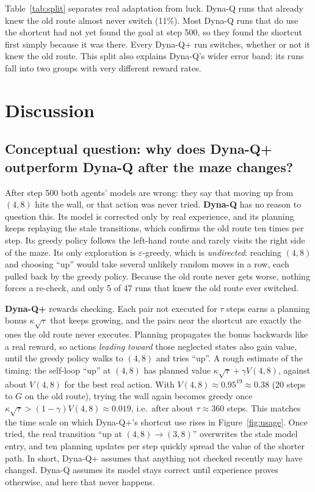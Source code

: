 \documentclass[11pt]{article}
\begin{document}
\noindent Table~\ref{tab:split} separates real adaptation from luck. Dyna-Q runs that already
knew the old route almost never switch (11\%). Most Dyna-Q runs that do use the shortcut had not
yet found the goal at step 500, so they found the shortcut first simply because it was there.
Every Dyna-Q+ run switches, whether or not it knew the old route. This split also explains
Dyna-Q's wider error band: its runs fall into two groups with very different reward rates.

\section{Discussion}

\subsection{Conceptual question: why does Dyna-Q+ outperform Dyna-Q after the maze changes?}
After step 500 both agents' models are wrong: they say that moving up from $(4,8)$ hits the
wall, or that action was never tried. \textbf{Dyna-Q} has no reason to question this. Its model
is corrected only by real experience, and its planning keeps replaying the stale transitions,
which confirms the old route ten times per step. Its greedy policy follows the left-hand route
and rarely visits the right side of the maze. Its only exploration is $\varepsilon$-greedy, which
is \emph{undirected}: reaching $(4,8)$ and choosing ``up'' would take several unlikely random
moves in a row, each pulled back by the greedy policy. Because the old route never gets worse,
nothing forces a re-check, and only 5 of 47 runs that knew the old route ever switched.

\textbf{Dyna-Q+} rewards checking. Each pair not executed for $\tau$ steps earns a planning bonus
$\kappa\sqrt{\tau}$ that keeps growing, and the pairs near the shortcut are exactly the ones the old
route never executes. Planning propagates the bonus backwards like a real reward, so actions
\emph{leading toward} those neglected states also gain value, until the greedy policy walks to
$(4,8)$ and tries ``up''. A rough estimate of the timing: the self-loop ``up'' at $(4,8)$ has
planned value $\kappa\sqrt{\tau} + \gamma V(4,8)$, against about $V(4,8)$ for the best real
action. With $V(4,8) \approx 0.95^{19} \approx 0.38$ (20 steps to $G$ on the old route), trying
the wall again becomes greedy once $\kappa\sqrt{\tau} > (1-\gamma)V(4,8) \approx 0.019$, i.e.\
after about $\tau \approx 360$ steps. This matches the time scale on which Dyna-Q+'s shortcut use
rises in Figure~\ref{fig:usage}. Once tried, the real transition ``up at $(4,8) \to (3,8)$''
overwrites the stale model entry, and ten planning updates per step quickly spread the value of
the shorter path. In short, Dyna-Q+ assumes that anything not checked recently may have
changed. Dyna-Q assumes its model stays correct until experience proves otherwise, and here that
never happens.
\end{document}
